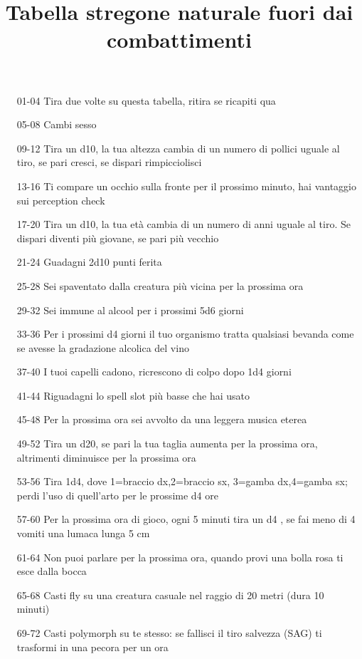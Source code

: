 \documentclass[10pt,a4paper]{article}
\title{Tabella stregone naturale fuori dai combattimenti}\date{}
\begin{document}
\maketitle
\thispagestyle{empty}
\begin{itemize}
\item[01-04]Tira due volte su questa tabella, ritira se ricapiti qua
\item[05-08]Cambi sesso
\item[09-12]Tira un d10, la tua altezza cambia  di un numero di pollici uguale al tiro, se pari cresci, se dispari rimpicciolisci
\item[13-16] Ti compare un occhio sulla fronte per il prossimo minuto, hai vantaggio sui perception check
\item[17-20]Tira un d10, la tua et\`a cambia di un numero di anni uguale al tiro. Se dispari diventi pi\`u giovane, se pari pi\`u vecchio
\item[21-24]Guadagni 2d10 punti ferita
\item[25-28]Sei spaventato dalla creatura pi\`u vicina per la prossima ora
\item[29-32]Sei immune al alcool per i prossimi 5d6 giorni
\item[33-36]Per i prossimi d4 giorni il tuo organismo tratta qualsiasi bevanda come se avesse la gradazione alcolica del vino 
\item[37-40]I tuoi capelli cadono, ricrescono di colpo dopo 1d4 giorni
\item[41-44]Riguadagni lo spell slot pi\`u basse che hai usato
\item[45-48]Per la prossima ora sei avvolto da una leggera musica eterea
\item[49-52]Tira un d20, se pari la tua taglia aumenta per la prossima ora, altrimenti diminuisce per la prossima ora
\item[53-56]Tira 1d4, dove 1=braccio dx,2=braccio sx, 3=gamba dx,4=gamba sx; perdi l'uso di quell'arto per le prossime d4 ore
\item[57-60]Per la prossima ora di gioco, ogni 5 minuti tira un d4 , se fai meno di 4 vomiti una lumaca lunga 5 cm
\item[61-64]Non puoi parlare per la prossima ora, quando provi una bolla rosa ti esce dalla bocca
\item[65-68]Casti fly su una creatura casuale nel raggio di 20 metri (dura 10 minuti)
\item[69-72]Casti polymorph su te stesso: se fallisci il tiro salvezza (SAG) ti trasformi in una pecora per un ora

\end{itemize}
\end{document}
